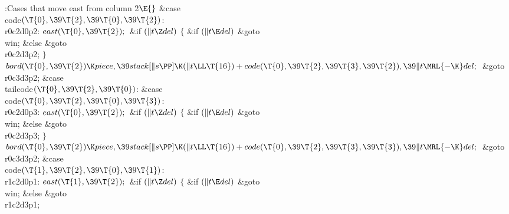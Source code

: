 \B{}:Cases that move east from column 2\X${}\E{}$\6
\4\&{case} \\{code}${}(\T{0},\39\T{2},\39\T{0},\39\T{2}){}$:\5
\\{r0c2d0p2}:\5
${}\\{east}(\T{0},\39\T{2});{}$\6
\&{if} ${}(\|t\Z\\{del}){}$\5
${}\{{}$\5
\1\&{if} ${}(\|t\E\\{del}){}$\1\5
\&{goto} \\{win};\5
\2\&{else}\1\5
\&{goto} \\{r0c2d3p2};\5
\2${}\}{}$\2\6
${}\\{bord}(\T{0},\39\T{2})\K\\{piece},\39\\{stack}[\|s\PP]\K(\|t\LL\T{16})+%
\\{code}(\T{0},\39\T{2},\39\T{3},\39\T{2}),\39\|t\MRL{-{\K}}\\{del};{}$\6
\&{goto} \\{r0c3d3p2};\6
\4\&{case} \\{tailcode}${}(\T{0},\39\T{2},\39\T{0}){}$:\5
\&{case} \\{code}${}(\T{0},\39\T{2},\39\T{0},\39\T{3}){}$:\5
\\{r0c2d0p3}:\5
${}\\{east}(\T{0},\39\T{2});{}$\6
\&{if} ${}(\|t\Z\\{del}){}$\5
${}\{{}$\5
\1\&{if} ${}(\|t\E\\{del}){}$\1\5
\&{goto} \\{win};\5
\2\&{else}\1\5
\&{goto} \\{r0c2d3p3};\5
\2${}\}{}$\2\6
${}\\{bord}(\T{0},\39\T{2})\K\\{piece},\39\\{stack}[\|s\PP]\K(\|t\LL\T{16})+%
\\{code}(\T{0},\39\T{2},\39\T{3},\39\T{3}),\39\|t\MRL{-{\K}}\\{del};{}$\6
\&{goto} \\{r0c3d3p2};\6
\4\&{case} \\{code}${}(\T{1},\39\T{2},\39\T{0},\39\T{1}){}$:\5
\\{r1c2d0p1}:\5
${}\\{east}(\T{1},\39\T{2});{}$\6
\&{if} ${}(\|t\Z\\{del}){}$\5
${}\{{}$\5
\1\&{if} ${}(\|t\E\\{del}){}$\1\5
\&{goto} \\{win};\5
\2\&{else}\1\5
\&{goto} \\{r1c2d3p1};\5
